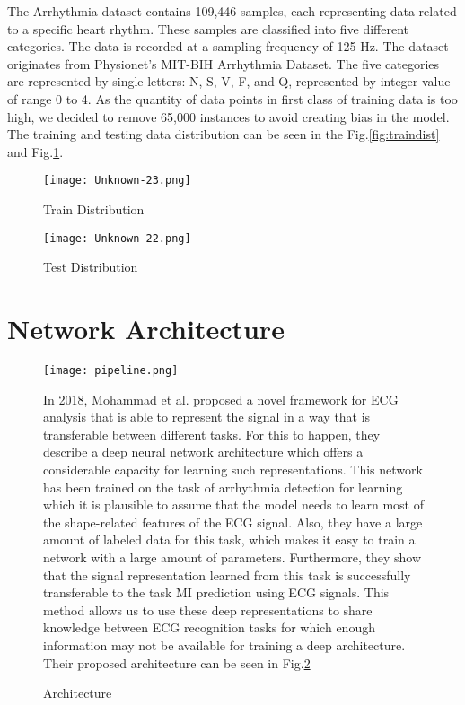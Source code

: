 \documentclass{article}
\begin{document}
The Arrhythmia dataset contains 109,446 samples, each representing data related to a specific heart rhythm. These samples are classified into five different categories. The data is recorded at a sampling frequency of 125 Hz. The dataset originates from Physionet's MIT-BIH Arrhythmia Dataset. The five categories are represented by single letters: N, S, V, F, and Q, represented by integer value of range 0 to 4. As the quantity of data points in first class of training data is too high, we decided to remove 65,000 instances to avoid creating bias in the model. The training and testing data distribution can be seen in the Fig.\ref{fig:traindist} and Fig.\ref{fig:testdist}.

\begin{figure}[H]
  \centering
  \begin{minipage}[b]{0.4\textwidth}
    \texttt{[image: Unknown-23.png]}
    \caption{Train Distribution}
    \label{fig:traindist}
  \end{minipage}
  \hfill
  \begin{minipage}[b]{0.4\textwidth}
    \texttt{[image: Unknown-22.png]}
    \caption{Test Distribution}
    \label{fig:testdist}
  \end{minipage}
\end{figure}

\section{Network Architecture}
\begin{figure}[H]
\begin{minipage}[b]{0.35\textwidth}
\texttt{[image: pipeline.png]}
\caption{Architecture}
\label{fig:pipeline}

\end{minipage}
\begin{minipage}[b]{0.7\textwidth}
In 2018, Mohammad et al. proposed a novel framework for ECG analysis that is able to represent the signal in a way that is transferable between different tasks. For this to happen, they describe a deep neural network architecture which offers a considerable capacity for learning such representations. This network has been trained on the task of arrhythmia detection for learning which it is plausible to assume that the model needs to learn most of the shape-related features of the ECG signal. Also, they have a large amount of labeled data for this task, which makes it easy to train a network with a large amount of parameters. Furthermore, they show that the signal representation learned from this task is successfully transferable to the task MI prediction using ECG signals. This method allows us to use these deep representations to share knowledge between ECG recognition tasks for which enough information may not be available for training a deep architecture.\\

Their proposed architecture can be seen in Fig.\ref{fig:pipeline}
\end{minipage}
\end{figure}
\newpage
\end{document}
